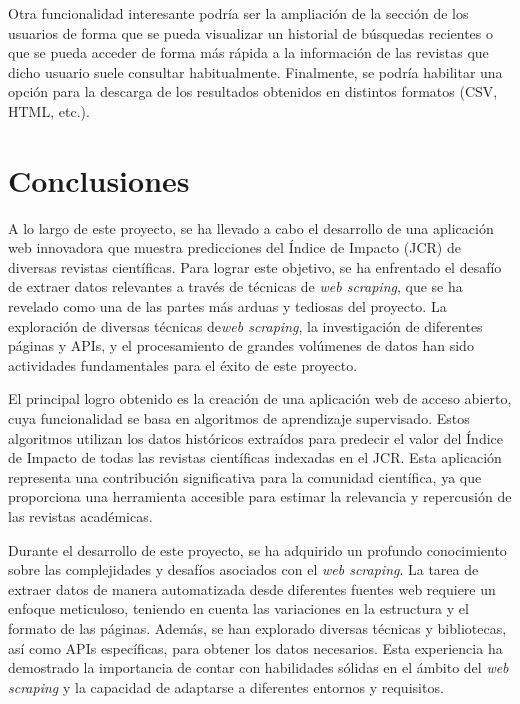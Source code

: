 Otra funcionalidad interesante podría ser la ampliación de la sección de los usuarios de forma que se pueda visualizar un historial de búsquedas recientes o que se pueda acceder de forma más rápida a la información de las revistas que dicho usuario suele consultar habitualmente. Finalmente, se podría habilitar una opción para la descarga de los resultados obtenidos en distintos formatos (CSV, HTML, etc.).




\section{Conclusiones}

A lo largo de este proyecto, se ha llevado a cabo el desarrollo de una aplicación web innovadora que muestra predicciones del Índice de Impacto (JCR) de diversas revistas científicas. Para lograr este objetivo, se ha enfrentado el desafío de extraer datos relevantes a través de técnicas de \textit{web scraping}, que se ha revelado como una de las partes más arduas y tediosas del proyecto. La exploración de diversas técnicas de\textit{web scraping}, la investigación de diferentes páginas y APIs, y el procesamiento de grandes volúmenes de datos han sido actividades fundamentales para el éxito de este proyecto.

El principal logro obtenido es la creación de una aplicación web de acceso abierto, cuya funcionalidad se basa en algoritmos de aprendizaje supervisado. Estos algoritmos utilizan los datos históricos extraídos para predecir el valor del Índice de Impacto de todas las revistas científicas indexadas en el JCR. Esta aplicación representa una contribución significativa para la comunidad científica, ya que proporciona una herramienta accesible para estimar la relevancia y repercusión de las revistas académicas.

Durante el desarrollo de este proyecto, se ha adquirido un profundo conocimiento sobre las complejidades y desafíos asociados con el \textit{web scraping}. La tarea de extraer datos de manera automatizada desde diferentes fuentes web requiere un enfoque meticuloso, teniendo en cuenta las variaciones en la estructura y el formato de las páginas. Además, se han explorado diversas técnicas y bibliotecas, así como APIs específicas, para obtener los datos necesarios. Esta experiencia ha demostrado la importancia de contar con habilidades sólidas en el ámbito del \textit{web scraping} y la capacidad de adaptarse a diferentes entornos y requisitos.

